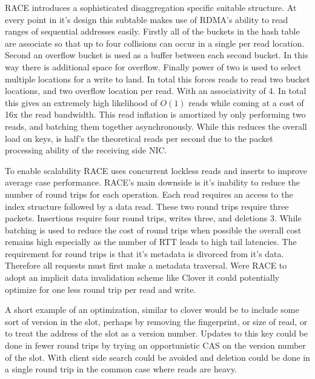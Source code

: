 RACE introduces a sophisticated disaggregation specific suitable structure. At
every point in it's design this subtable makes use of RDMA's ability to read
ranges of sequential addresses easily. Firstly all of the buckets in the hash
table are associate so that up to four collisions can occur in a single per read
location. Second an overflow bucket is used as a buffer between each second
bucket. In this way there is additional space for overflow. Finally power of two
is used to select multiple locations for a write to land. In total this forces
reads to read two bucket locations, and two overflow location per read. With an
associativity of 4. In total this gives an extremely high likelihood of $O(1)$
reads while coming at a cost of 16x the read bandwidth. This read inflation is
amortized by only performing two reads, and batching them together
asynchronously. While this reduces the overall load on keys, is half's the
theoretical reads per second due to the packet processing ability of the
receiving side NIC. 

To enable scalability RACE uses concurrent lockless reads and inserts to improve
average case performance.  RACE's main downside is it's inability to reduce the
number of round trips for each operation. Each read requires an access to the
index structure followed by a data read. These two round trips require three
packets. Insertions require four round trips, writes three, and deletions 3.
While batching is used to reduce the cost of round trips when possible the
overall cost remains high especially as the number of RTT leads to high tail
latencies. The requirement for round trips is that it's metadata is divorced
from it's data. Therefore all requests must first make a metadata traversal.
Were RACE to adopt an implicit data invalidation scheme like Clover it could
potentially optimize for one less round trip per read and write.

A short example of an optimization, similar to clover would be to include some
sort of version in the slot, perhaps by removing the fingerprint, or size of
read, or to treat the address of the slot as a version number. Updates to this
key could be done in fewer round trips by trying an opportunistic CAS on the
version number of the slot. With client side search could be avoided and
deletion could be done in a single round trip in the common case where reads are
heavy.



